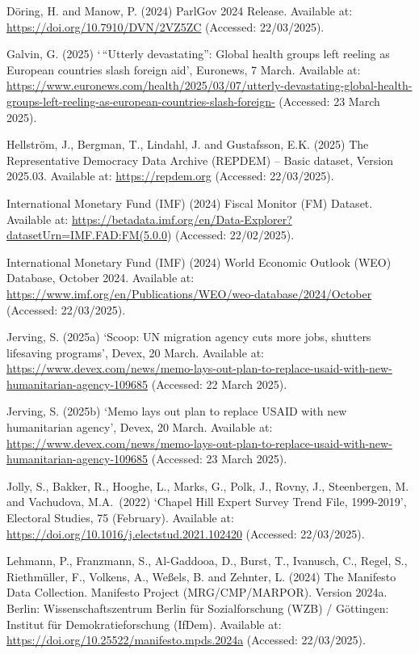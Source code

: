 \documentclass[
]{article}
\begin{document}
Döring, H. and Manow, P. (2024) ParlGov 2024 Release. Available at:
\url{https://doi.org/10.7910/DVN/2VZ5ZC} (Accessed: 22/03/2025).

Galvin, G. (2025) `\,``Utterly devastating'': Global health groups left
reeling as European countries slash foreign aid', Euronews, 7 March.
Available at:
\url{https://www.euronews.com/health/2025/03/07/utterly-devastating-global-health-groups-left-reeling-as-european-countries-slash-foreign-}
(Accessed: 23 March 2025).

Hellström, J., Bergman, T., Lindahl, J. and Gustafsson, E.K. (2025) The
Representative Democracy Data Archive (REPDEM) -- Basic dataset, Version
2025.03. Available at: \url{https://repdem.org} (Accessed: 22/03/2025).

International Monetary Fund (IMF) (2024) Fiscal Monitor (FM) Dataset.
Available at:
\url{https://betadata.imf.org/en/Data-Explorer?datasetUrn=IMF.FAD:FM(5.0.0})
(Accessed: 22/02/2025).

International Monetary Fund (IMF) (2024) World Economic Outlook (WEO)
Database, October 2024. Available at:
\url{https://www.imf.org/en/Publications/WEO/weo-database/2024/October}
(Accessed: 22/03/2025).

Jerving, S. (2025a) `Scoop: UN migration agency cuts more jobs, shutters
lifesaving programs', Devex, 20 March. Available at:
\url{https://www.devex.com/news/memo-lays-out-plan-to-replace-usaid-with-new-humanitarian-agency-109685}
(Accessed: 22 March 2025).

Jerving, S. (2025b) `Memo lays out plan to replace USAID with new
humanitarian agency', Devex, 20 March. Available at:
\url{https://www.devex.com/news/memo-lays-out-plan-to-replace-usaid-with-new-humanitarian-agency-109685}
(Accessed: 23 March 2025).

Jolly, S., Bakker, R., Hooghe, L., Marks, G., Polk, J., Rovny, J.,
Steenbergen, M. and Vachudova, M.A.~(2022) `Chapel Hill Expert Survey
Trend File, 1999-2019', Electoral Studies, 75 (February). Available at:
\url{https://doi.org/10.1016/j.electstud.2021.102420} (Accessed:
22/03/2025).

Lehmann, P., Franzmann, S., Al-Gaddooa, D., Burst, T., Ivanusch, C.,
Regel, S., Riethmüller, F., Volkens, A., Weßels, B. and Zehnter, L.
(2024) The Manifesto Data Collection. Manifesto Project
(MRG/CMP/MARPOR). Version 2024a. Berlin: Wissenschaftszentrum Berlin für
Sozialforschung (WZB) / Göttingen: Institut für Demokratieforschung
(IfDem). Available at:
\url{https://doi.org/10.25522/manifesto.mpds.2024a} (Accessed:
22/03/2025).
\end{document}
